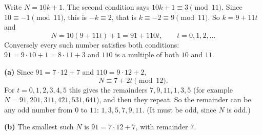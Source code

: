 Write $N=10k+1$. The second condition says $10k+1\equiv3\pmod{11}$. Since $10\equiv-1\pmod{11}$, this is $-k\equiv2$, that is $k\equiv-2\equiv9\pmod{11}$. So $k=9+11t$ and
\[N=10(9+11t)+1=91+110t,\qquad t=0,1,2,\dots\]
Conversely every such number satisfies both conditions: $91=9\cdot10+1=8\cdot11+3$ and $110$ is a multiple of both $10$ and $11$.

\textbf{(a)} Since $91=7\cdot12+7$ and $110=9\cdot12+2$,
\[N\equiv7+2t\pmod{12}.\]
For $t=0,1,2,3,4,5$ this gives the remainders $7,9,11,1,3,5$ (for example $N=91,201,311,421,531,641$), and then they repeat. So the remainder can be any odd number from $0$ to $11$: $\boxed{1,3,5,7,9,11}$. (It must be odd, since $N$ is odd.)

\textbf{(b)} The smallest such $N$ is $91=7\cdot12+7$, with remainder $\boxed{7}$.
